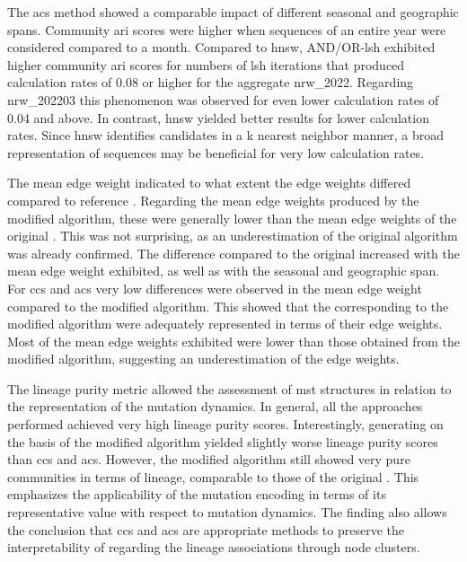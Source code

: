 The \acrshort{acs} method showed a comparable impact of different seasonal and geographic spans. Community \acrshort{ari} scores were higher when sequences of an entire year were considered compared to a month. Compared to \acrshort{hnsw}, AND/OR-\acrshort{lsh} exhibited higher community \acrshort{ari} scores for numbers of \acrshort{lsh} iterations that produced calculation rates of 0.08 or higher for the aggregate nrw\_2022. Regarding nrw\_202203 this phenomenon was observed for even lower calculation rates of 0.04 and above. In contrast, \acrshort{hnsw} yielded better results for lower calculation rates. Since \acrshort{hnsw} identifies candidates in a k nearest neighbor manner, a broad representation of sequences may be beneficial for very low calculation rates.

The mean edge weight indicated to what extent the edge weights differed compared to reference . Regarding the mean edge weights produced by the modified algorithm, these were generally lower than the mean edge weights of the original . This was not surprising, as an underestimation of the original algorithm was already confirmed. The difference compared to the original  increased with the mean edge weight exhibited, as well as with the seasonal and geographic span. For \acrshort{ccs} and \acrshort{acs} very low differences were observed in the mean edge weight compared to the modified algorithm. This showed that the  corresponding to the modified algorithm were adequately represented in terms of their edge weights. Most of the mean edge weights exhibited were lower than those obtained from the modified algorithm, suggesting an underestimation of the edge weights.

The lineage purity metric allowed the assessment of \acrshort{mst} structures in relation to the representation of the mutation dynamics. In general, all the approaches performed achieved very high lineage purity scores. Interestingly, generating  on the basis of the modified algorithm yielded slightly worse lineage purity scores than \acrshort{ccs} and \acrshort{acs}. However, the modified algorithm still showed very pure communities in terms of lineage, comparable to those of the original . This emphasizes the applicability of the mutation encoding in terms of its representative value with respect to mutation dynamics. The finding also allows the conclusion that \acrshort{ccs} and \acrshort{acs} are appropriate methods to preserve the interpretability of  regarding the lineage associations through node clusters.

